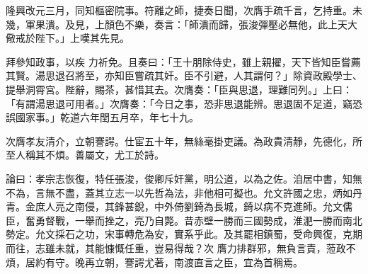 \begin{pinyinscope}
 隆興改元三月，同知樞密院事。符離之師，捷奏日聞，次膺手疏千言，乞持重。未幾，軍果潰。及見，上顏色不樂，奏言：「師潰而歸，張浚彈壓必無他，此上天大儆戒於陛下。」上嘆其先見。



 拜參知政事，以疾
 力祈免。且奏曰：「王十朋除侍史，雖上親擢，天下皆知臣嘗薦其賢。湯思退召將至，亦知臣嘗疏其奸。臣不引避，人其謂何？」除資政殿學士、提舉洞霄宮。陛辭，賜茶，甚惜其去。次膺奏：「臣與思退，理難同列。」上曰：「有謂湯思退可用者。」次膺奏：「今日之事，恐非思退能辨。思退固不足道，竊恐誤國家事。」乾道六年閏五月卒，年七十九。



 次膺孝友清介，立朝謇諤。仕宦五十年，無絲毫掛吏議。為政貴清靜，先德化，所至人稱其不煩。善屬文，尤工於詩。



 論曰：孝宗志恢復，特任張浚，俊卿斥奸黨，明公道，以為之佐。洎居中書，知無不為，言無不盡，蓋其立志一以先哲為法，非他相可擬也。允文許國之忠，炳如丹青。金庶人亮之南侵，其鋒甚銳，中外倚劉錡為長城，錡以病不克進師。允文儒臣，奮勇督戰，一舉而挫之，亮乃自斃。昔赤壁一勝而三國勢成，淮淝一勝而南北勢定。允文採石之功，宋事轉危為安，實系乎此。及其罷相鎮蜀，受命興復，克期而往，志雖未就，其能慷慨任重，豈易得哉？次
 膺力排群邪，無負言責，蒞政不煩，居約有守。晚再立朝，謇諤尤著，南渡直言之臣，宜為首稱焉。



\end{pinyinscope}